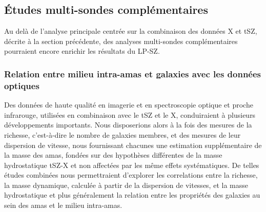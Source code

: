 \subsection{\'Etudes multi-sondes complémentaires}

Au delà de l'analyse principale centrée sur la combinaison des données
X et tSZ, décrite à la section précédente, des analyses multi-sondes
complémentaires pourraient encore enrichir les résultats du LP-SZ. 

\subsubsection{Relation entre milieu intra-amas et galaxies avec les
  données optiques}

Des données de haute qualité en imagerie et en spectroscopie optique
et proche infrarouge, utilisées en combinaison avec le tSZ et le X,
conduiraient à plusieurs développements importants. Nous disposerions
alors à la fois des mesures de la richesse, c'est-à-dire le nombre de
galaxies membres, et des mesures de leur dispersion de vitesse, nous
fournissant chacunes une estimation supplémentaire de la masse des
amas, fondées sur des hypothèses différentes de la masse hydrostatique
tSZ-X et non affectées par les même effets systématiques. De telles
études combinées nous permettraient d'explorer les correlations entre
la richesse, la masse dynamique, calculée à partir de la dispersion de
vitesses, et la masse hydrostatique et plus généralement la relation
entre les propriétés des galaxies au sein des amas et le milieu
intra-amas.

